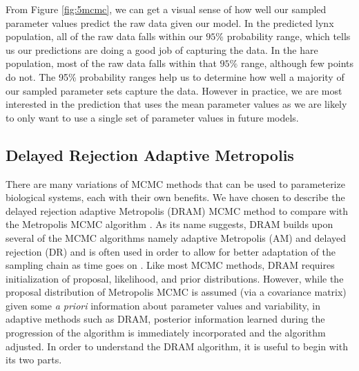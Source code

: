 From Figure \ref{fig:5mcmc}, we can get a visual sense of how well our sampled parameter values predict the raw data given our model. In the predicted lynx population, all of the raw data falls within our $95\%$ probability range, which tells us our predictions are doing a good job of capturing the data. In the hare population, most of the raw data falls within that $95\%$ range, although few points do not. The 95\% probability ranges help us to determine how well a majority of our sampled parameter sets capture the data. However in practice, we are most interested in the prediction that uses the mean parameter values as we are likely to only want to use a single set of parameter values in future models.
\subsection{Delayed Rejection Adaptive Metropolis} \label{Delayed_Rejection_Adaptive_Metropolis}
There are many variations of MCMC methods that can be used to parameterize biological systems, each with their own benefits. We have chosen to describe the delayed rejection adaptive Metropolis (DRAM) MCMC method to compare with the Metropolis MCMC algorithm \cite{DRAM1}. As its name suggests, DRAM builds upon several of the MCMC algorithms namely adaptive Metropolis (AM) and delayed rejection (DR) and is often used in order to allow for better adaptation of the sampling chain as time goes on \cite{DRAM1}. Like most MCMC methods, DRAM requires initialization of proposal, likelihood, and prior distributions. However, while the proposal distribution of Metropolis MCMC is assumed (via a covariance matrix) given some \emph{a priori} information about parameter values and variability, in adaptive methods such as DRAM, posterior information learned during the progression of the algorithm is immediately incorporated and the algorithm adjusted. In order to understand the DRAM algorithm, it is useful to begin with its two parts.
